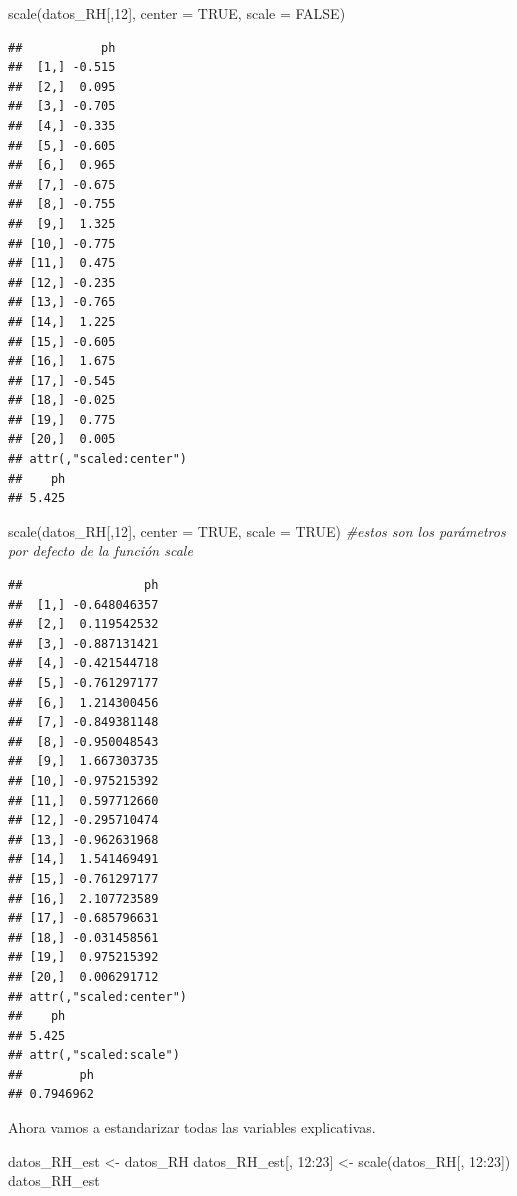 \documentclass[
]{book}
\newenvironment{Shaded}{\begin{snugshade}}{\end{snugshade}}
\newcommand{\AttributeTok}[1]{\textcolor[rgb]{0.77,0.63,0.00}{#1}}
\newcommand{\CommentTok}[1]{\textcolor[rgb]{0.56,0.35,0.01}{\textit{#1}}}
\newcommand{\ConstantTok}[1]{\textcolor[rgb]{0.00,0.00,0.00}{#1}}
\newcommand{\DecValTok}[1]{\textcolor[rgb]{0.00,0.00,0.81}{#1}}
\newcommand{\FunctionTok}[1]{\textcolor[rgb]{0.00,0.00,0.00}{#1}}
\newcommand{\NormalTok}[1]{#1}
\newcommand{\OtherTok}[1]{\textcolor[rgb]{0.56,0.35,0.01}{#1}}
\newcommand{\SpecialCharTok}[1]{\textcolor[rgb]{0.00,0.00,0.00}{#1}}
\begin{document}
\begin{Shaded}
\begin{Highlighting}[]
\FunctionTok{scale}\NormalTok{(datos\_RH[,}\DecValTok{12}\NormalTok{], }\AttributeTok{center =} \ConstantTok{TRUE}\NormalTok{, }\AttributeTok{scale =} \ConstantTok{FALSE}\NormalTok{)}
\end{Highlighting}
\end{Shaded}

\begin{verbatim}
##           ph
##  [1,] -0.515
##  [2,]  0.095
##  [3,] -0.705
##  [4,] -0.335
##  [5,] -0.605
##  [6,]  0.965
##  [7,] -0.675
##  [8,] -0.755
##  [9,]  1.325
## [10,] -0.775
## [11,]  0.475
## [12,] -0.235
## [13,] -0.765
## [14,]  1.225
## [15,] -0.605
## [16,]  1.675
## [17,] -0.545
## [18,] -0.025
## [19,]  0.775
## [20,]  0.005
## attr(,"scaled:center")
##    ph 
## 5.425
\end{verbatim}

\begin{Shaded}
\begin{Highlighting}[]
\FunctionTok{scale}\NormalTok{(datos\_RH[,}\DecValTok{12}\NormalTok{], }\AttributeTok{center =} \ConstantTok{TRUE}\NormalTok{, }\AttributeTok{scale =} \ConstantTok{TRUE}\NormalTok{) }\CommentTok{\#estos son los parámetros por defecto de la función scale}
\end{Highlighting}
\end{Shaded}

\begin{verbatim}
##                 ph
##  [1,] -0.648046357
##  [2,]  0.119542532
##  [3,] -0.887131421
##  [4,] -0.421544718
##  [5,] -0.761297177
##  [6,]  1.214300456
##  [7,] -0.849381148
##  [8,] -0.950048543
##  [9,]  1.667303735
## [10,] -0.975215392
## [11,]  0.597712660
## [12,] -0.295710474
## [13,] -0.962631968
## [14,]  1.541469491
## [15,] -0.761297177
## [16,]  2.107723589
## [17,] -0.685796631
## [18,] -0.031458561
## [19,]  0.975215392
## [20,]  0.006291712
## attr(,"scaled:center")
##    ph 
## 5.425 
## attr(,"scaled:scale")
##        ph 
## 0.7946962
\end{verbatim}

Ahora vamos a estandarizar todas las variables explicativas.

\begin{Shaded}
\begin{Highlighting}[]
\NormalTok{datos\_RH\_est }\OtherTok{\textless{}{-}}\NormalTok{ datos\_RH}
\NormalTok{datos\_RH\_est[, }\DecValTok{12}\SpecialCharTok{:}\DecValTok{23}\NormalTok{] }\OtherTok{\textless{}{-}} \FunctionTok{scale}\NormalTok{(datos\_RH[, }\DecValTok{12}\SpecialCharTok{:}\DecValTok{23}\NormalTok{])}
\NormalTok{datos\_RH\_est}
\end{Highlighting}
\end{Shaded}
\end{document}
